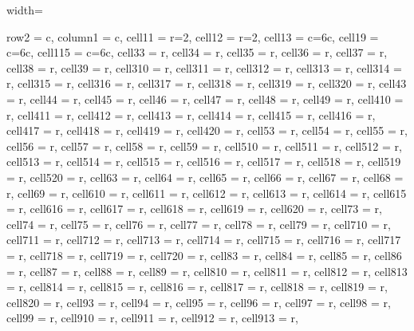 \documentclass[lettersize,journal]{IEEEtran}
\begin{document}
\begin{table}
\caption{Internal Similarity and Diversity metrics for experimental datasets.}
\centering
\begin{adjustbox}{width=\textwidth}
\begin{tblr}{
  row{2} = {c},  column{1} = {c}, cell{1}{1} = {r=2}{},  cell{1}{2} = {r=2}{},  cell{1}{3} = {c=6}{c},  cell{1}{9} = {c=6}{c},  cell{1}{15} = {c=6}{c},  cell{3}{3} = {r},  cell{3}{4} = {r},  cell{3}{5} = {r},  cell{3}{6} = {r},  cell{3}{7} = {r},  cell{3}{8} = {r},  cell{3}{9} = {r},  cell{3}{10} = {r},  cell{3}{11} = {r},  cell{3}{12} = {r},  cell{3}{13} = {r},  cell{3}{14} = {r},  cell{3}{15} = {r},  cell{3}{16} = {r},  cell{3}{17} = {r},  cell{3}{18} = {r},  cell{3}{19} = {r},  cell{3}{20} = {r},  cell{4}{3} = {r},  cell{4}{4} = {r},  cell{4}{5} = {r},  cell{4}{6} = {r},  cell{4}{7} = {r},  cell{4}{8} = {r},  cell{4}{9} = {r},  cell{4}{10} = {r},  cell{4}{11} = {r},  cell{4}{12} = {r},  
  cell{4}{13} = {r},  cell{4}{14} = {r},  cell{4}{15} = {r},  cell{4}{16} = {r},  cell{4}{17} = {r},  cell{4}{18} = {r},  cell{4}{19} = {r},  cell{4}{20} = {r},  cell{5}{3} = {r},  cell{5}{4} = {r},  cell{5}{5} = {r},  cell{5}{6} = {r},  cell{5}{7} = {r},  cell{5}{8} = {r},  cell{5}{9} = {r},  cell{5}{10} = {r},  cell{5}{11} = {r},  cell{5}{12} = {r},  cell{5}{13} = {r},  cell{5}{14} = {r},  cell{5}{15} = {r},  cell{5}{16} = {r},  cell{5}{17} = {r},  cell{5}{18} = {r},  cell{5}{19} = {r},  cell{5}{20} = {r},  cell{6}{3} = {r},  cell{6}{4} = {r},  
  cell{6}{5} = {r},  cell{6}{6} = {r},  cell{6}{7} = {r},  cell{6}{8} = {r},  cell{6}{9} = {r},  cell{6}{10} = {r},  cell{6}{11} = {r},  cell{6}{12} = {r},  cell{6}{13} = {r},  cell{6}{14} = {r},  cell{6}{15} = {r},  cell{6}{16} = {r},  cell{6}{17} = {r},  cell{6}{18} = {r},  cell{6}{19} = {r},  cell{6}{20} = {r},  cell{7}{3} = {r},  cell{7}{4} = {r},  cell{7}{5} = {r},  cell{7}{6} = {r},  cell{7}{7} = {r},  cell{7}{8} = {r},  cell{7}{9} = {r},  cell{7}{10} = {r},  cell{7}{11} = {r},  cell{7}{12} = {r},  cell{7}{13} = {r},  cell{7}{14} = {r},  cell{7}{15} = {r},  cell{7}{16} = {r},  cell{7}{17} = {r},  cell{7}{18} = {r},  cell{7}{19} = {r},  cell{7}{20} = {r},  cell{8}{3} = {r},  
  cell{8}{4} = {r},  cell{8}{5} = {r},  cell{8}{6} = {r},  cell{8}{7} = {r},  cell{8}{8} = {r},  cell{8}{9} = {r},  cell{8}{10} = {r},  cell{8}{11} = {r},  cell{8}{12} = {r},  cell{8}{13} = {r},  cell{8}{14} = {r},  cell{8}{15} = {r},  cell{8}{16} = {r},  cell{8}{17} = {r},  cell{8}{18} = {r},  cell{8}{19} = {r},  cell{8}{20} = {r},  cell{9}{3} = {r},  cell{9}{4} = {r},  cell{9}{5} = {r},  cell{9}{6} = {r},  cell{9}{7} = {r},  cell{9}{8} = {r},  cell{9}{9} = {r},  cell{9}{10} = {r},  cell{9}{11} = {r},  cell{9}{12} = {r},  cell{9}{13} = {r},  
}
\end{tblr}
\end{adjustbox}
\end{table}
\end{document}

